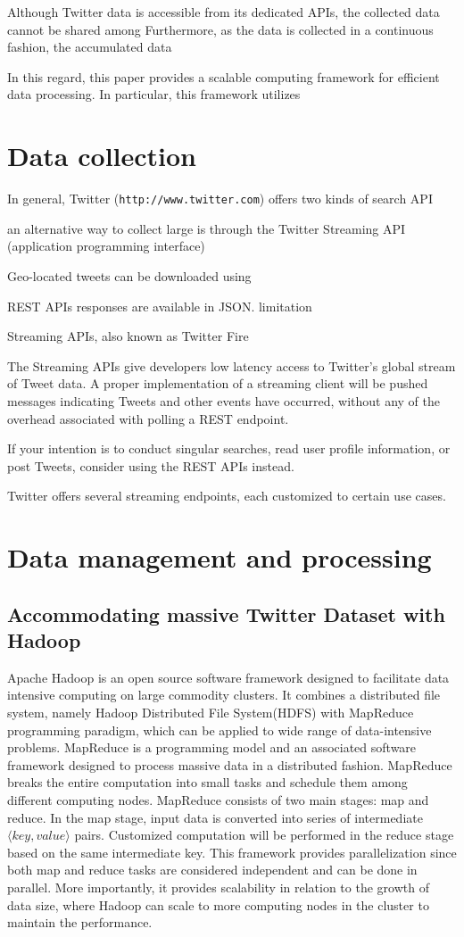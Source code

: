\documentclass[a4paper,11pt]{article}
\begin{document}
Although Twitter data is accessible from its dedicated APIs, the collected data cannot be shared among
Furthermore, as the data is collected in a continuous fashion, the accumulated data

In this regard, this paper provides a scalable computing framework for efficient data processing.
In particular, this framework utilizes 
 


\section*{Data collection}
In general, Twitter ({\tt{http://www.twitter.com}}) offers two kinds of search API 

an alternative way to collect large is through the Twitter Streaming API (application programming interface)

Geo-located tweets can be downloaded using 

REST APIs responses are available in JSON.
limitation


Streaming APIs, also known as Twitter Fire 

The Streaming APIs give developers low latency access to Twitter’s global stream of Tweet data. 
A proper implementation of a streaming client will be pushed messages indicating Tweets and other events have occurred, without any of the overhead associated with polling a REST endpoint.


If your intention is to conduct singular searches, read user profile information, or post Tweets, consider using the REST APIs instead.

Twitter offers several streaming endpoints, each customized to certain use cases.


\section*{Data management and processing}
\subsection*{Accommodating massive Twitter Dataset with Hadoop}
Apache Hadoop is an open source software framework designed to facilitate data intensive computing on large commodity clusters.
It combines a distributed file system, namely Hadoop Distributed File System(HDFS) with MapReduce programming paradigm, which can be applied to wide range of data-intensive problems.
MapReduce is a programming model and an associated software framework designed to process massive data in a distributed fashion.
MapReduce breaks the entire computation into small tasks and schedule them among different computing nodes.
MapReduce consists of two main stages: map and reduce.
In the map stage, input data is converted into series of intermediate $\langle key, value\rangle$ pairs.
Customized computation will be performed in the reduce stage based on the same intermediate key.
This framework provides parallelization since both map and reduce tasks are considered independent and can be done in parallel. More importantly, it provides scalability in relation to the growth of data size, where Hadoop can scale to more computing nodes in the cluster to maintain the performance.
\end{document}
